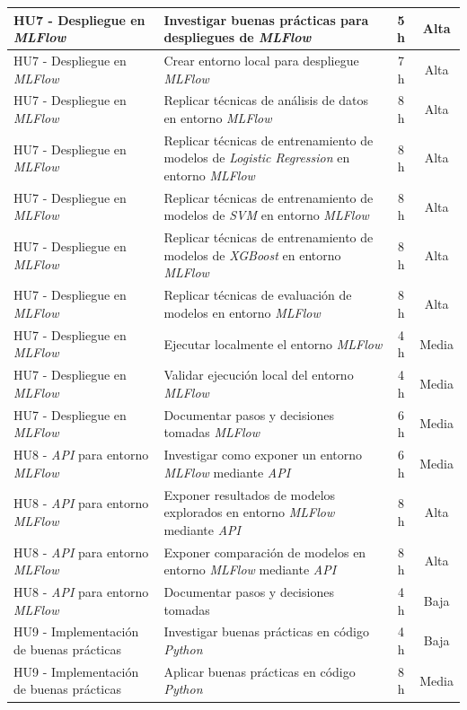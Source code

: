 \documentclass[
11pt, %
]{charter}
\begin{document}
\begin{xltabular}{\linewidth}{@{}|X|X|c|c|@{}}
HU7 - Despliegue en \textit{MLFlow} & Investigar buenas prácticas para despliegues de \textit{MLFlow} & 5 h & Alta \\ \hline
HU7 - Despliegue en \textit{MLFlow} & Crear entorno local para despliegue \textit{MLFlow} & 7 h & Alta \\ \hline
HU7 - Despliegue en \textit{MLFlow} & Replicar técnicas de análisis de datos en entorno \textit{MLFlow} & 8 h & Alta \\ \hline
HU7 - Despliegue en \textit{MLFlow} & Replicar técnicas de entrenamiento de modelos de \textit{Logistic Regression} en entorno \textit{MLFlow} & 8 h & Alta \\ \hline
HU7 - Despliegue en \textit{MLFlow} & Replicar técnicas de entrenamiento de modelos de \textit{SVM} en entorno \textit{MLFlow} & 8 h & Alta \\ \hline
HU7 - Despliegue en \textit{MLFlow} & Replicar técnicas de entrenamiento de modelos de \textit{XGBoost} en entorno \textit{MLFlow} & 8 h & Alta \\ \hline
HU7 - Despliegue en \textit{MLFlow} & Replicar técnicas de evaluación de modelos en entorno \textit{MLFlow} & 8 h & Alta \\ \hline
HU7 - Despliegue en \textit{MLFlow} & Ejecutar localmente el entorno \textit{MLFlow} & 4 h & Media \\ \hline
HU7 - Despliegue en \textit{MLFlow} & Validar ejecución local del entorno \textit{MLFlow} & 4 h & Media \\ \hline
HU7 - Despliegue en \textit{MLFlow} & Documentar pasos y decisiones tomadas \textit{MLFlow} & 6 h & Media \\ \hline
HU8 - \textit{API} para entorno \textit{MLFlow} & Investigar como exponer un entorno \textit{MLFlow} mediante \textit{API} & 6 h & Media \\ \hline
HU8 - \textit{API} para entorno \textit{MLFlow} & Exponer resultados de modelos explorados en entorno \textit{MLFlow} mediante \textit{API} & 8 h & Alta \\ \hline
HU8 - \textit{API} para entorno \textit{MLFlow} & Exponer comparación de modelos en entorno \textit{MLFlow} mediante \textit{API} & 8 h & Alta \\ \hline
HU8 - \textit{API} para entorno \textit{MLFlow} & Documentar pasos y decisiones tomadas & 4 h & Baja \\ \hline
HU9 - Implementación de buenas prácticas & Investigar buenas prácticas en código \textit{Python} & 4 h & Baja \\ \hline
HU9 - Implementación de buenas prácticas & Aplicar buenas prácticas en código \textit{Python} & 8 h & Media \\ \hline

\end{xltabular}
\end{document}
